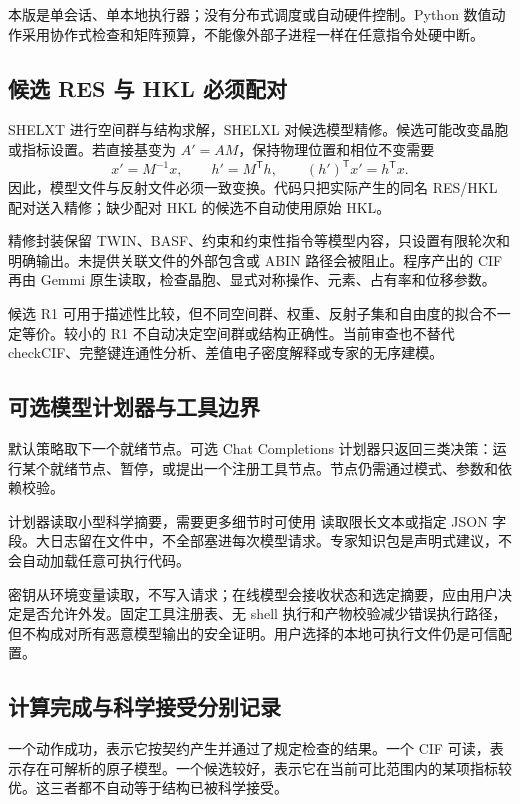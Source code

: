 \documentclass[UTF8,11pt,a4paper,fontset=fandol]{ctexart}
\newcommand{\T}{^{\mathsf T}}
\newcommand{\code}[1]{\texttt{\detokenize{#1}}}
\begin{document}
本版是单会话、单本地执行器；没有分布式调度或自动硬件控制。Python 数值动作采用协作式检查和矩阵预算，不能像外部子进程一样在任意指令处硬中断。

\subsection{候选 RES 与 HKL 必须配对}

SHELXT 进行空间群与结构求解，SHELXL 对候选模型精修\cite{shelxt,shelxl,shelxl-manual}。候选可能改变晶胞或指标设置。若直接基变为 $A'=AM$，保持物理位置和相位不变需要
\begin{equation}
 x'=M^{-1}x,\qquad h'=M\T h,\qquad (h')\T x'=h\T x.
\end{equation}
因此，模型文件与反射文件必须一致变换。代码只把实际产生的同名 RES/HKL 配对送入精修；缺少配对 HKL 的候选不自动使用原始 HKL。

精修封装保留 TWIN、BASF、约束和约束性指令等模型内容，只设置有限轮次和明确输出。未提供关联文件的外部包含或 ABIN 路径会被阻止。程序产出的 CIF 再由 Gemmi 原生读取，检查晶胞、显式对称操作、元素、占有率和位移参数。

候选 R1 可用于描述性比较，但不同空间群、权重、反射子集和自由度的拟合不一定等价。较小的 R1 不自动决定空间群或结构正确性。当前审查也不替代 checkCIF、完整键连通性分析、差值电子密度解释或专家的无序建模。

\subsection{可选模型计划器与工具边界}

默认策略取下一个就绪节点。可选 Chat Completions 计划器只返回三类决策：运行某个就绪节点、暂停，或提出一个注册工具节点。节点仍需通过模式、参数和依赖校验。

计划器读取小型科学摘要，需要更多细节时可使用 \code{artifact.inspect} 读取限长文本或指定 JSON 字段。大日志留在文件中，不全部塞进每次模型请求。专家知识包是声明式建议，不会自动加载任意可执行代码。

密钥从环境变量读取，不写入请求；在线模型会接收状态和选定摘要，应由用户决定是否允许外发。固定工具注册表、无 shell 执行和产物校验减少错误执行路径，但不构成对所有恶意模型输出的安全证明。用户选择的本地可执行文件仍是可信配置。

\subsection{计算完成与科学接受分别记录}

一个动作成功，表示它按契约产生并通过了规定检查的结果。一个 CIF 可读，表示存在可解析的原子模型。一个候选较好，表示它在当前可比范围内的某项指标较优。这三者都不自动等于结构已被科学接受。
\end{document}
